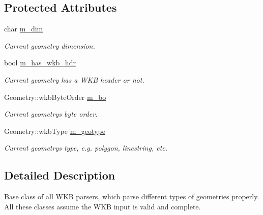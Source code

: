 \subsection*{Protected Attributes}
\begin{DoxyCompactItemize}
\item 
\mbox{\label{classStepper__base_ab2168c1848a011b256a967c7c6f9cdde}} 
char \mbox{\hyperlink{classStepper__base_ab2168c1848a011b256a967c7c6f9cdde}{m\+\_\+dim}}
\begin{DoxyCompactList}\small\item\em Current geometry dimension. \end{DoxyCompactList}\item 
\mbox{\label{classStepper__base_abacdebcb218430bf21dad9332dfb694e}} 
bool \mbox{\hyperlink{classStepper__base_abacdebcb218430bf21dad9332dfb694e}{m\+\_\+has\+\_\+wkb\+\_\+hdr}}
\begin{DoxyCompactList}\small\item\em Current geometry has a W\+KB header or not. \end{DoxyCompactList}\item 
\mbox{\label{classStepper__base_a1040fc996a886599ab5c7d49f3cae0ff}} 
Geometry\+::wkb\+Byte\+Order \mbox{\hyperlink{classStepper__base_a1040fc996a886599ab5c7d49f3cae0ff}{m\+\_\+bo}}
\begin{DoxyCompactList}\small\item\em Current geometry\textquotesingle{}s byte order. \end{DoxyCompactList}\item 
\mbox{\label{classStepper__base_aa466a72b2d01bff8b48ca8bdcf6525f0}} 
Geometry\+::wkb\+Type \mbox{\hyperlink{classStepper__base_aa466a72b2d01bff8b48ca8bdcf6525f0}{m\+\_\+geotype}}
\begin{DoxyCompactList}\small\item\em Current geometry\textquotesingle{}s type, e.\+g. polygon, linestring, etc. \end{DoxyCompactList}\end{DoxyCompactItemize}


\subsection{Detailed Description}
Base class of all W\+KB parsers, which parse different types of geometries properly. All these classes assume the W\+KB input is valid and complete. 

